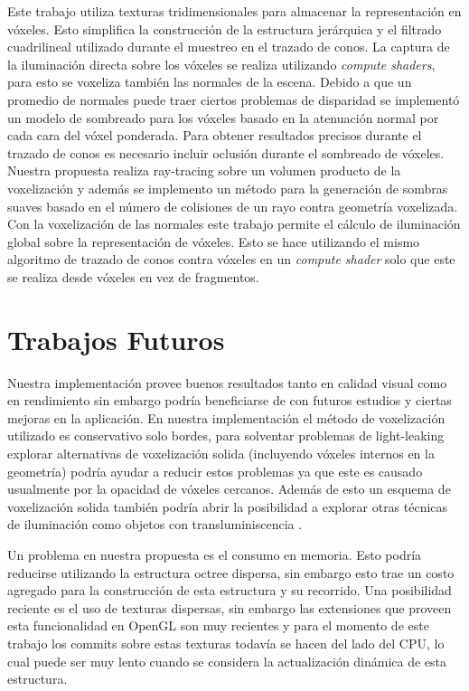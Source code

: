 Este trabajo utiliza texturas tridimensionales para almacenar la representación en vóxeles. Esto simplifica la construcción de la estructura jerárquica y el filtrado cuadrilineal utilizado durante el muestreo en el trazado de conos. La captura de la iluminación directa sobre los vóxeles se realiza utilizando \emph{compute shaders}, para esto se voxeliza también las normales de la escena. Debido a que un promedio de normales puede traer ciertos problemas de disparidad se implementó un modelo de sombreado para los vóxeles basado en la atenuación normal por cada cara del vóxel ponderada. Para obtener resultados precisos durante el trazado de conos es necesario incluir oclusión durante el sombreado de vóxeles. Nuestra propuesta realiza ray-tracing sobre un volumen producto de la voxelización y además se implemento un método para la generación de sombras suaves basado en el número de colisiones de un rayo contra geometría voxelizada. Con la voxelización de las normales este trabajo permite el cálculo de iluminación global sobre la representación de vóxeles. Esto se hace utilizando el mismo algoritmo de trazado de conos contra vóxeles en un \emph{compute shader} solo que este se realiza desde vóxeles en vez de fragmentos.

\section{Trabajos Futuros} %
\label{sec:trabajos_futuros}
Nuestra implementación provee buenos resultados tanto en calidad visual como en rendimiento sin embargo podría beneficiarse de con futuros estudios y ciertas mejoras en la aplicación. En nuestra implementación el método de voxelización utilizado es conservativo solo bordes, para solventar problemas de light-leaking explorar alternativas de voxelización solida (incluyendo vóxeles internos en la geometría) podría ayudar a reducir estos problemas ya que este es causado usualmente por la opacidad de vóxeles cercanos. Además de esto un esquema de voxelización solida también podría abrir la posibilidad a explorar otras técnicas de iluminación como objetos con transluminiscencia \cite{Eisemann:2008:SGS:1375714.1375728}.

Un problema en nuestra propuesta es el consumo en memoria. Esto podría reducirse utilizando la estructura octree dispersa, sin embargo esto trae un costo agregado para la construcción de esta estructura y su recorrido. Una posibilidad reciente es el uso de texturas dispersas, sin embargo las extensiones que proveen esta funcionalidad en OpenGL son muy recientes y para el momento de este trabajo los commits sobre estas texturas todavía se hacen del lado del CPU, lo cual puede ser muy lento cuando se considera la actualización dinámica de esta estructura.

